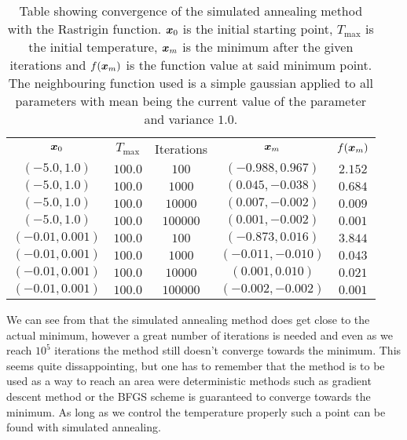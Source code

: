         \begin{table}[H]
            \centering
            \caption{Table showing convergence of the simulated annealing
            method with the Rastrigin function. $\boldsymbol{{x}}_0$ is the initial
            starting point, $T_{\text{max}}$ is the initial temperature,
            $\boldsymbol{{x}}_m$ is the minimum after the given iterations and
            $f(\boldsymbol{{x}}_m)$ is the function value at said minimum point. The
            neighbouring function used is a simple gaussian applied to all
            parameters with mean being the current value of the parameter and
            variance $1.0$.}
            \label{tab:rastriginconv}
            \begin{tabular}{ccccc} \hline\hline
                $\boldsymbol{{x}}_0$ & $T_{\text{max}}$ & Iterations & $\boldsymbol{{x}}_m$ & $f(\boldsymbol{{x}}_m)$ \\
                $(-5.0,1.0)$ & $100.0$ & $100$ & $(-0.988,0.967)$ & $2.152$ \\
                $(-5.0,1.0)$ & $100.0$ & $1000$ & $(0.045,-0.038)$ & $0.684$ \\
                $(-5.0,1.0)$ & $100.0$ & $10000$ & $(0.007,-0.002)$ & $0.009$ \\
                $(-5.0,1.0)$ & $100.0$ & $100000$ & $(0.001,-0.002)$ & $0.001$ \\
                $(-0.01,0.001)$ & $100.0$ & $100$ & $(-0.873,0.016)$ & $3.844$ \\
                $(-0.01,0.001)$ & $100.0$ & $1000$ & $(-0.011,-0.010)$ & $0.043$ \\
                $(-0.01,0.001)$ & $100.0$ & $10000$ & $(0.001,0.010)$ & $0.021$ \\
                $(-0.01,0.001)$ & $100.0$ & $100000$ & $(-0.002,-0.002)$ & $0.001$ \\ \hline\hline
            \end{tabular}
        \end{table} 
        We can see from  that the
        simulated annealing method does get close to the actual minimum,
        however a great number of iterations is needed and even as we reach
        $10^5$ iterations the method still doesn't converge towards the
        minimum. This seems quite dissappointing, but one has to remember that
        the method is to be used as a way to reach an area were deterministic
        methods such as gradient descent method or the BFGS scheme is
        guaranteed to converge towards the minimum. As long as we control the
        temperature properly such a point can be found with simulated
        annealing.
    
